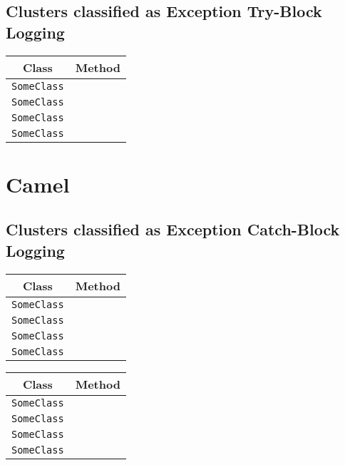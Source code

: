 \subsection{Clusters classified as Exception Try-Block Logging}

\begin{center}
\begin{tabular}{ll}\toprule
\multicolumn{1}{c}{Class}&\multicolumn{1}{c}{Method}\\\midrule
\lstinline/SomeClass/&\raisebox{0pt}{\lstinline/foo(int)/}\\
\lstinline/SomeClass/&\raisebox{0pt}{\lstinline/foo(int)/}\\
\lstinline/SomeClass/&\raisebox{0pt}{\lstinline/foo(int)/}\\
\lstinline/SomeClass/&\raisebox{0pt}{\lstinline/foo(int)/}\\
\bottomrule
\end{tabular}
\end{center}

\section{Camel}\label{camel}

\subsection{Clusters classified as Exception Catch-Block Logging}

\begin{center}
\begin{tabular}{ll}\toprule
\multicolumn{1}{c}{Class}&\multicolumn{1}{c}{Method}\\\midrule
\lstinline/SomeClass/&\raisebox{0pt}{\lstinline/foo(int)/}\\
\lstinline/SomeClass/&\raisebox{0pt}{\lstinline/foo(int)/}\\
\lstinline/SomeClass/&\raisebox{0pt}{\lstinline/foo(int)/}\\
\lstinline/SomeClass/&\raisebox{0pt}{\lstinline/foo(int)/}\\
\bottomrule
\end{tabular}
\end{center}

\begin{center}
\begin{tabular}{ll}\toprule
\multicolumn{1}{c}{Class}&\multicolumn{1}{c}{Method}\\\midrule
\lstinline/SomeClass/&\raisebox{0pt}{\lstinline/foo(int)/}\\
\lstinline/SomeClass/&\raisebox{0pt}{\lstinline/foo(int)/}\\
\lstinline/SomeClass/&\raisebox{0pt}{\lstinline/foo(int)/}\\
\lstinline/SomeClass/&\raisebox{0pt}{\lstinline/foo(int)/}\\
\bottomrule
\end{tabular}
\end{center}

